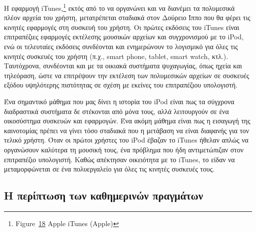 \documentclass[
]{article}
\begin{document}
Η εφαρμογή iTunes,\footnote{Figure~\protect\hyperlink{fig:itunes3}{18}
  Apple iTunes (Apple)} εκτός από το να οργανώνει και να διανέμει τα
πολυμεσικά πλέον αρχεία του χρήστη, μετατρέπεται σταδιακά στον Δούρειο
Ίππο που θα φέρει τις κινητές εφαρμογές στη συσκευή του χρήστη. Οι
πρώτες εκδόσεις του iTunes είναι επιτραπέζιες εφαρμογές εκτέλεσης
μουσικών αρχείων και συγχρονισμού με το iPod, ενώ οι τελευταίες εκδόσεις
συνδέονται και ενημερώνουν το λογισμικό για όλες τις κινητές συσκευές
του χρήστη (π.χ., smart phone, tablet, smart watch, κτλ.). Ταυτόχρονα,
συνδέονται και με τα οικιακά συστήματα ψυχαγωγίας, όπως ηχεία και
τηλεόραση, ώστε να επιτρέψουν την εκτέλεση των πολυμεσικών αρχείων σε
συσκευές εξόδου υψηλότερης πιστότητας σε σχέση με εκείνες του
επιτραπέζιου υπολογιστή.

Ένα σημαντικό μάθημα που μας δίνει η ιστορία του iPod είναι πως τα
σύγχρονα διαδραστικά συστήματα δε στέκονται από μόνα τους, αλλά
λειτουργούν σε ένα οικοσύστημα συσκευών και εφαρμογών. Ένα ακόμη μάθημα
είναι πως η εισαγωγή της καινοτομίας πρέπει να γίνει τόσο σταδιακά που η
μετάβαση να είναι διαφανής για τον τελικό χρήστη. Όταν οι πρώτοι χρήστες
του iPod έβαζαν το iTunes ήθελαν απλώς να οργανώσουν καλύτερα τη μουσική
τους, ένα πρόβλημα που ήδη αντιμετώπιζαν στον επιτραπέζιο υπολογιστή.
Καθώς απέκτησαν οικειότητα με το iTunes, το είδαν να μεταμορφώνεται σε
ένα πολυεργαλείο για όλες τις κινητές συσκευές τους.

\hypertarget{ux3b7-ux3c0ux3b5ux3c1ux3afux3c0ux3c4ux3c9ux3c3ux3b7-ux3c4ux3c9ux3bd-ux3baux3b1ux3b8ux3b7ux3bcux3b5ux3c1ux3b9ux3bdux3ceux3bd-ux3c0ux3c1ux3b1ux3b3ux3bcux3acux3c4ux3c9ux3bd}{%
\subsection{Η περίπτωση των καθημερινών
πραγμάτων}\label{ux3b7-ux3c0ux3b5ux3c1ux3afux3c0ux3c4ux3c9ux3c3ux3b7-ux3c4ux3c9ux3bd-ux3baux3b1ux3b8ux3b7ux3bcux3b5ux3c1ux3b9ux3bdux3ceux3bd-ux3c0ux3c1ux3b1ux3b3ux3bcux3acux3c4ux3c9ux3bd}}
\end{document}
